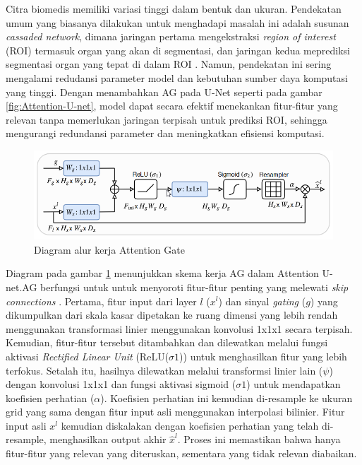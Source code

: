 \noindent Citra biomedis memiliki variasi tinggi dalam bentuk dan ukuran. Pendekatan umum yang biasanya dilakukan untuk menghadapi masalah ini adalah susunan \textit{cassaded network}, dimana jaringan pertama  mengekstraksi \textit{region of interest} (ROI) termasuk organ yang akan di segmentasi, dan jaringan kedua meprediksi segmentasi organ yang tepat di dalam ROI \cite{oktay_attention_2018}. Namun, pendekatan ini sering mengalami redudansi parameter model dan kebutuhan sumber daya komputasi yang tinggi. Dengan menambahkan AG pada U-Net seperti pada gambar \ref{fig:Attention-U-net}, model dapat secara efektif menekankan fitur-fitur yang relevan tanpa memerlukan jaringan terpisah untuk prediksi ROI, sehingga mengurangi redundansi parameter dan meningkatkan efisiensi komputasi\cite{azad_medical_2022}.


\begin{figure}[H]
	\centering
	\includegraphics[scale=.6]{gambar/AG.png}
	\caption{Diagram alur kerja Attention Gate \cite{oktay_attention_2018}}
	\label{fig:AG}
\end{figure}

Diagram pada gambar \ref{fig:AG} menunjukkan skema kerja AG dalam Attention U-net.AG berfungsi untuk untuk menyoroti fitur-fitur penting yang melewati \textit{skip connections} \cite{siddique_u-net_2020,oktay_attention_2018}. Pertama, fitur input dari layer \(l\) (\(x^l\))  dan sinyal \textit{gating} (\(g\)) yang dikumpulkan dari skala kasar dipetakan ke ruang dimensi yang lebih rendah menggunakan transformasi linier menggunakan konvolusi 1x1x1 secara terpisah. Kemudian, fitur-fitur tersebut ditambahkan dan dilewatkan melalui fungsi aktivasi \textit{Rectified Linear Unit} (ReLU($\sigma1$)) untuk menghasilkan fitur yang lebih terfokus. Setalah itu, hasilnya dilewatkan melalui transformsi linier lain ($\psi$) dengan konvolusi 1x1x1 dan fungsi aktivasi sigmoid ($\sigma1$) untuk mendapatkan koefisien perhatian ($\alpha$). Koefisien perhatian ini kemudian di-resample ke ukuran grid yang sama dengan fitur input asli menggunakan interpolasi bilinier. Fitur input asli \(x^l\) kemudian diskalakan dengan koefisien perhatian yang telah di-resample, menghasilkan output akhir $\hat{x}^l$. Proses ini memastikan bahwa hanya fitur-fitur yang relevan yang diteruskan, sementara yang tidak relevan diabaikan.



